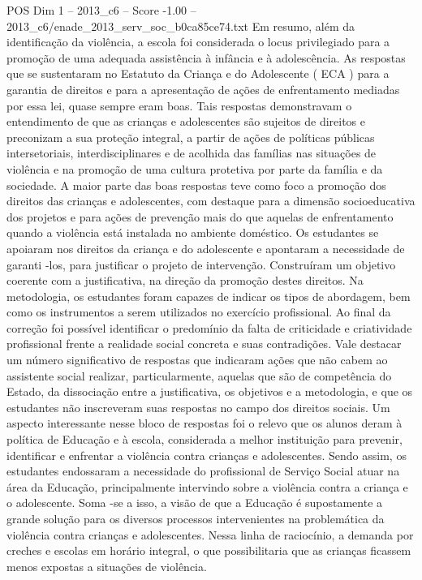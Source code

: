 \begin{textsample}{POS Dim 1 – 2013\_c6 – Score -1.00 – 2013\_c6/enade\_2013\_serv\_soc\_b0ca85ce74.txt}
Em resumo, além da identificação da violência, a escola foi considerada o locus privilegiado para a promoção de uma adequada assistência à infância e à adolescência.
As respostas que se sustentaram no Estatuto da Criança e do Adolescente ( ECA ) para a garantia de direitos e para a apresentação de ações de enfrentamento mediadas por essa lei, quase sempre eram boas.
Tais respostas demonstravam o entendimento de que as crianças e adolescentes são sujeitos de direitos e preconizam a sua proteção integral, a partir de ações de políticas públicas intersetoriais, interdisciplinares e de acolhida das famílias nas situações de violência e na promoção de uma cultura protetiva por parte da família e da sociedade.
A maior parte das boas respostas teve como foco a promoção dos direitos das crianças e adolescentes, com destaque para a dimensão socioeducativa dos projetos e para ações de prevenção mais do que aquelas de enfrentamento quando a violência está instalada no ambiente doméstico.
Os estudantes se apoiaram nos direitos da criança e do adolescente e apontaram a necessidade de garanti -los, para justificar o projeto de intervenção.
Construíram um objetivo coerente com a justificativa, na direção da promoção destes direitos.
Na metodologia, os estudantes foram capazes de indicar os tipos de abordagem, bem como os instrumentos a serem utilizados no exercício profissional.
Ao final da correção foi possível identificar o predomínio da falta de criticidade e criatividade profissional frente a realidade social concreta e suas contradições.
Vale destacar um número significativo de respostas que indicaram ações que não cabem ao assistente social realizar, particularmente, aquelas que são de competência do Estado, da dissociação entre a justificativa, os objetivos e a metodologia, e que os estudantes não inscreveram suas respostas no campo dos direitos sociais.
Um aspecto interessante nesse bloco de respostas foi o relevo que os alunos deram à política de Educação e à escola, considerada a melhor instituição para prevenir, identificar e enfrentar a violência contra crianças e adolescentes.
Sendo assim, os estudantes endossaram a necessidade do profissional de Serviço Social atuar na área da Educação, principalmente intervindo sobre a violência contra a criança e o adolescente.
Soma -se a isso, a visão de que a Educação é supostamente a grande solução para os diversos processos intervenientes na problemática da violência contra crianças e adolescentes.
Nessa linha de raciocínio, a demanda por creches e escolas em horário integral, o que possibilitaria que as crianças ficassem menos expostas a situações de violência.

\end{textsample}
